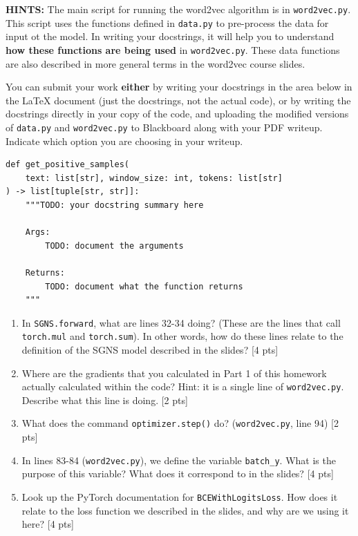 \documentclass[11pt]{article}
\begin{document}
\textbf{HINTS:} The main script for running the word2vec algorithm is in \texttt{word2vec.py}. This script uses the functions defined in \texttt{data.py} to pre-process the data for input ot the model. In writing your docstrings, it will help you to understand \textbf{how these functions are being used} in \texttt{word2vec.py}. These data functions are also described in more general terms in the word2vec course slides.

You can submit your work \textbf{either} by writing your docstrings in the area below in the LaTeX document (just the docstrings, not the actual code), or by writing the docstrings directly in your copy of the code, and uploading the modified versions of \texttt{data.py} and \texttt{word2vec.py} to Blackboard along with your PDF writeup. Indicate which option you are choosing in your writeup.

\begin{lstlisting}
def get_positive_samples(
    text: list[str], window_size: int, tokens: list[str]
) -> list[tuple[str, str]]:
    """TODO: your docstring summary here

    Args:
        TODO: document the arguments

    Returns:
        TODO: document what the function returns
    """
\end{lstlisting}

\vspace{2em}
\begin{enumerate}[label=\alph*.]
  \item In \texttt{SGNS.forward}, what are lines 32-34 doing? (These are the lines that call \texttt{torch.mul} and \texttt{torch.sum}). In other words, how do these lines relate to the definition of the SGNS model described in the slides? [4 pts]
  \item Where are the gradients that you calculated in Part 1 of this homework actually calculated within the code? Hint: it is a single line of \texttt{word2vec.py}. Describe what this line is doing. [2 pts]
  \item What does the command \texttt{optimizer.step()} do? (\texttt{word2vec.py}, line 94) [2 pts]
  \item In lines 83-84 (\texttt{word2vec.py}), we define the variable \texttt{batch\_y}. What is the purpose of this variable? What does it correspond to in the slides? [4 pts]
  \item Look up the PyTorch documentation for \texttt{BCEWithLogitsLoss}. How does it relate to the loss function we described in the slides, and why are we using it here? [4 pts]
\end{enumerate}
\end{document}
